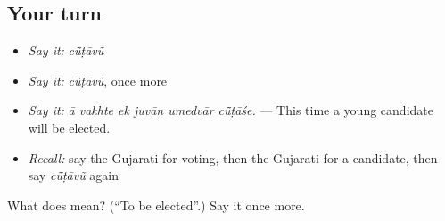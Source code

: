 \subsection*{Your turn}
\begin{itemize}
\raggedright
  \item \emph{Say it:} \emph{cū̃ṭāvũ}
  \item \emph{Say it:} \emph{cū̃ṭāvũ}, once more
  \item \emph{Say it:} \emph{ā vakhte ek juvān umedvār cū̃ṭāśe.} — This time a young candidate will be elected.
  \item \emph{Recall:} say the Gujarati for voting, then the Gujarati for a candidate, then say \emph{cū̃ṭāvũ} again
\end{itemize}

\begin{tcolorbox}[breakable,colback=teal!4,colframe=teal!35!black,title={Before you move on}]
What does  mean? (\textquotedblleft{}To be elected\textquotedblright{}.) Say it once more.
\end{tcolorbox}
